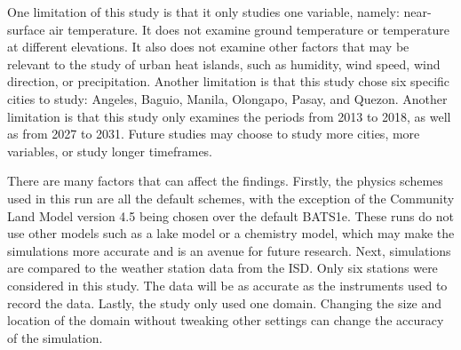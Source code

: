 		
	One limitation of this study is that it only studies one variable, namely: near-surface air temperature.
	It does not examine ground temperature or temperature at different elevations.
	It also does not examine other factors that may be relevant to the study of urban heat islands, such as humidity, wind speed, wind direction, or precipitation. 
	Another limitation is that this study chose six specific cities to study: Angeles, Baguio, Manila, Olongapo, Pasay, and Quezon.
	Another limitation is that this study only examines the periods from 2013 to 2018, as well as from 2027 to 2031.
	Future studies may choose to study more cities, more variables, or study longer timeframes.
	
	There are many factors that can affect the findings. 
	Firstly, the physics schemes used in this run are all the default schemes, with the exception of the Community Land Model version 4.5 being chosen over the default BATS1e. 
	These runs do not use other models such as a lake model or a chemistry model, which may make the simulations more accurate and is an avenue for future research.
	Next, simulations are compared to the weather station data from the ISD.
	Only six stations were considered in this study.
	The data will be as accurate as the instruments used to record the data.
	Lastly, the study only used one domain.
	Changing the size and location of the domain without tweaking other settings can change the accuracy of the simulation.